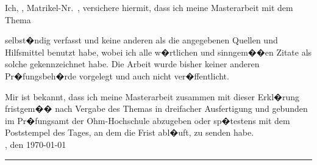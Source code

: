 Ich, \autor, Matrikel-Nr.\ \matrikelnr, versichere hiermit, dass ich meine Masterarbeit mit dem Thema
\begin{quote}
\textit{\titel} \textit{\untertitel}
\end{quote}
selbst�ndig verfasst und keine anderen als die angegebenen Quellen und Hilfsmittel benutzt habe, wobei ich alle w�rtlichen und sinngem��en Zitate als solche gekennzeichnet habe. Die Arbeit wurde bisher keiner anderen Pr�fungsbeh�rde vorgelegt und auch nicht ver�ffentlicht.

Mir ist bekannt, dass ich meine Masterarbeit zusammen mit dieser Erkl�rung fristgem�� nach Vergabe des Themas in dreifacher Ausfertigung und gebunden im Pr�fungsamt der Ohm-Hochschule abzugeben oder sp�testens mit dem Poststempel des Tages, an dem die Frist abl�uft, zu senden habe.\\[6ex]

\ort, den \today


\rule[-0.2cm]{5cm}{0.5pt}

\textsc{\autor} 
